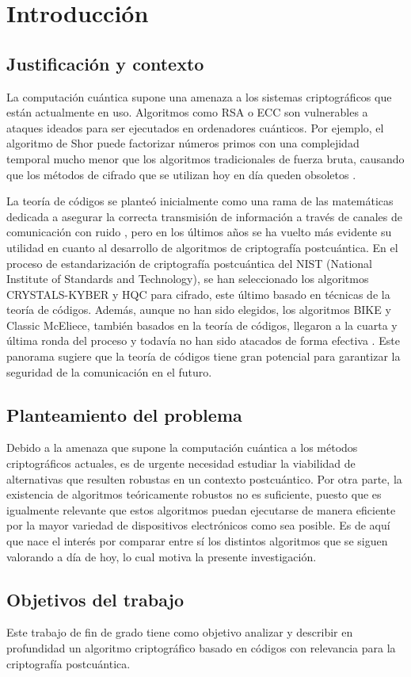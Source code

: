 \newpage{\pagestyle{empty}}
\chapter{Introducción}

\section{Justificación y contexto}

La computación cuántica supone una amenaza a los sistemas criptográficos que están actualmente en uso. Algoritmos como RSA o ECC son vulnerables a ataques ideados para ser ejecutados en ordenadores cuánticos. Por ejemplo, el algoritmo de Shor puede factorizar números primos con una complejidad temporal mucho menor que los algoritmos tradicionales de fuerza bruta, causando que los métodos de cifrado que se utilizan hoy en día queden obsoletos \autocite{Shor_1997}.

La teoría de códigos se planteó inicialmente como una rama de las matemáticas dedicada a asegurar la correcta transmisión de información a través de canales de comunicación con ruido \autocite{6772729}, pero en los últimos años se ha vuelto más evidente su utilidad en cuanto al desarrollo de algoritmos de criptografía postcuántica. En el proceso de estandarización de criptografía postcuántica del NIST (National Institute of Standards and Technology), se han seleccionado los algoritmos CRYSTALS-KYBER y HQC para cifrado, este último basado en técnicas de la teoría de códigos. Además, aunque no han sido elegidos, los algoritmos BIKE y Classic McEliece, también basados en la teoría de códigos, llegaron a la cuarta y última ronda del proceso y todavía no han sido atacados de forma efectiva \autocite{NIST8545}. Este panorama sugiere que la teoría de códigos tiene gran potencial para garantizar la seguridad de la comunicación en el futuro.

\section{Planteamiento del problema}

Debido a la amenaza que supone la computación cuántica a los métodos criptográficos actuales, es de urgente necesidad estudiar la viabilidad de alternativas que resulten robustas en un contexto postcuántico. Por otra parte, la existencia de algoritmos teóricamente robustos no es suficiente, puesto que es igualmente relevante que estos algoritmos puedan ejecutarse de manera eficiente por la mayor variedad de dispositivos electrónicos como sea posible. Es de aquí que nace el interés por comparar entre sí los distintos algoritmos que se siguen valorando a día de hoy, lo cual motiva la presente investigación.

\section{Objetivos del trabajo}

Este trabajo de fin de grado tiene como objetivo analizar y describir en profundidad un algoritmo criptográfico basado en códigos con relevancia para la criptografía postcuántica. 
